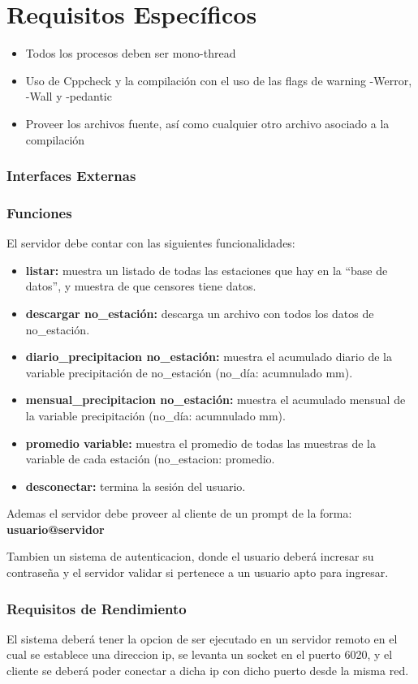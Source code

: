 \documentclass[10pt, a4paper,notitlepage]{article}
\begin{document}
\section{Requisitos Específicos}
\begin{itemize}
	\item Todos los procesos deben ser mono-thread
	\item Uso de Cppcheck y la compilación con el uso de las flags de warning -Werror, -Wall y -pedantic
	\item Proveer los archivos fuente, así como cualquier otro archivo asociado
	a la compilación
	
\end{itemize}

\subsubsection{Interfaces Externas}
\subsubsection{Funciones}
El servidor debe contar con las siguientes funcionalidades:
\begin{itemize}
	\item \textbf{listar:} muestra un listado de todas las estaciones que hay en la “base de datos”,
	y muestra de que censores tiene datos.
	\item \textbf{descargar no\_estación:} descarga un archivo con todos los datos de
	no\_estación.
	\item \textbf{diario\_precipitacion no\_estación:} muestra el acumulado diario de la variable
	precipitación de no\_estación (no\_día: acumnulado mm).
	\item\textbf{ mensual\_precipitacion no\_estación:} muestra el acumulado mensual de la
	variable precipitación (no\_día: acumnulado mm).
	\item \textbf{promedio variable:} muestra el promedio de todas las muestras de la variable
	de cada estación (no\_estacion: promedio.
	\item \textbf{desconectar:} termina la sesión del usuario.
\end{itemize}

Ademas el servidor debe proveer al cliente de un prompt de la forma:
\textbf{usuario@servidor}

Tambien un sistema de autenticacion, donde el usuario deberá incresar su contraseña y el servidor validar si pertenece a un usuario apto para ingresar.
\subsubsection{Requisitos de Rendimiento}
El sistema deberá tener la opcion de ser ejecutado en un servidor remoto en el cual se establece una direccion ip, se levanta un socket en el puerto 6020, y el cliente se deberá poder conectar a dicha ip con dicho puerto desde la misma red.
\end{document}

